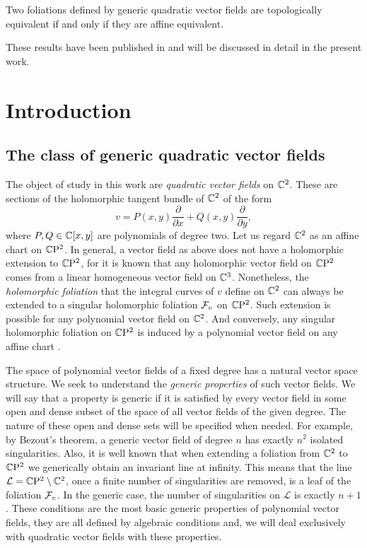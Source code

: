 \documentclass[phd,tocprelim]{cornell}
\begin{document}
\begin{prefthm}
Two foliations defined by generic quadratic vector fields are topologically equivalent if and only if they are affine equivalent.  
\end{prefthm}  

These results have been published in \cite{TwinVectorFields,UtmostRigidity} and will be discussed in detail in the present work.


\cleardoublepage
\normalspacing \setcounter{page}{1} 
\pagestyle{cornell} \addtolength{\parskip}{0.5\baselineskip}





\chapter{Introduction}

\section{The class of generic quadratic vector fields}

The object of study in this work are \textit{quadratic vector fields} on $\mathbb{C}^2$. These are sections of the holomorphic tangent bundle of $\mathbb{C}^2$ of the form 
 \[ v = P(x,y)\frac{\partial}{\partial x} + Q(x,y)\frac{\partial}{\partial y}, \]
where $P,Q\in\mathbb{C}[x,y]$ are polynomials of degree two. Let us regard $\mathbb{C}^2$ as an affine chart on $\mathbb{C}\mathrm{P}^2$. In general, a vector field as above does not have a holomorphic extension to $\mathbb{C}\mathrm{P}^2$, for it is known that any holomorphic vector field on $\mathbb{C}\mathrm{P}^2$ comes from a linear homogeneous vector field on $\mathbb{C}^3$. Nonetheless, the \textit{holomorphic foliation} that the integral curves of $v$ define on $\mathbb{C}^2$ can always be extended to a singular holomorphic foliation $\mathcal{F}_v$ on $\mathbb{C}\mathrm{P}^2$. Such extension is possible for any polynomial vector field on $\mathbb{C}^2$. And conversely, any singular holomorphic foliation on $\mathbb{C}\mathrm{P}^2$ is induced by a polynomial vector field on any affine chart \cite{Ilyashenko1972}.

The space of polynomial vector fields of a fixed degree has a natural vector space structure. We seek to understand the \textit{generic properties} of such vector fields. We will say that a property is generic if it is satisfied by every vector field in some open and dense subset of the space of all vector fields of the given degree. The nature of these open and dense sets will be specified when needed. For example, by Bezout's theorem, a generic vector field of degree $n$ has exactly $n^2$ isolated singularities. Also, it is well known that when extending a foliation from $\mathbb{C}^2$ to $\mathbb{C}\mathrm{P}^2$ we generically obtain an invariant line at infinity. This means that the line $\mathcal{L}=\mathbb{C}\mathrm{P}^2\setminus\mathbb{C}^2$, once a finite number of singularities are removed, is a leaf of the foliation $\mathcal{F}_v$. In the generic case, the number of singularities on $\mathcal{L}$ is exactly $n+1$. These conditions are the most basic generic properties of polynomial vector fields, they are all defined by algebraic conditions and, we will deal exclusively with quadratic vector fields with these properties. 
\end{document}
